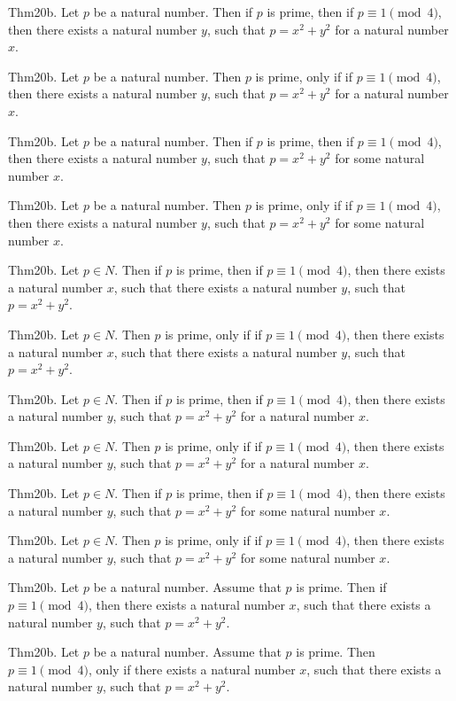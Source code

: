 \documentclass{article}
\begin{document}
Thm20b. Let $p$ be a natural number. Then if $p$ is prime, then if $p \equiv 1 \pmod{ 4}$, then there exists a natural number $y$, such that $p = x ^{ 2}+ y ^{ 2}$ for a natural number $x$.

Thm20b. Let $p$ be a natural number. Then $p$ is prime, only if if $p \equiv 1 \pmod{ 4}$, then there exists a natural number $y$, such that $p = x ^{ 2}+ y ^{ 2}$ for a natural number $x$.

Thm20b. Let $p$ be a natural number. Then if $p$ is prime, then if $p \equiv 1 \pmod{ 4}$, then there exists a natural number $y$, such that $p = x ^{ 2}+ y ^{ 2}$ for some natural number $x$.

Thm20b. Let $p$ be a natural number. Then $p$ is prime, only if if $p \equiv 1 \pmod{ 4}$, then there exists a natural number $y$, such that $p = x ^{ 2}+ y ^{ 2}$ for some natural number $x$.

Thm20b. Let $p \in N$. Then if $p$ is prime, then if $p \equiv 1 \pmod{ 4}$, then there exists a natural number $x$, such that there exists a natural number $y$, such that $p = x ^{ 2}+ y ^{ 2}$.

Thm20b. Let $p \in N$. Then $p$ is prime, only if if $p \equiv 1 \pmod{ 4}$, then there exists a natural number $x$, such that there exists a natural number $y$, such that $p = x ^{ 2}+ y ^{ 2}$.

Thm20b. Let $p \in N$. Then if $p$ is prime, then if $p \equiv 1 \pmod{ 4}$, then there exists a natural number $y$, such that $p = x ^{ 2}+ y ^{ 2}$ for a natural number $x$.

Thm20b. Let $p \in N$. Then $p$ is prime, only if if $p \equiv 1 \pmod{ 4}$, then there exists a natural number $y$, such that $p = x ^{ 2}+ y ^{ 2}$ for a natural number $x$.

Thm20b. Let $p \in N$. Then if $p$ is prime, then if $p \equiv 1 \pmod{ 4}$, then there exists a natural number $y$, such that $p = x ^{ 2}+ y ^{ 2}$ for some natural number $x$.

Thm20b. Let $p \in N$. Then $p$ is prime, only if if $p \equiv 1 \pmod{ 4}$, then there exists a natural number $y$, such that $p = x ^{ 2}+ y ^{ 2}$ for some natural number $x$.

Thm20b. Let $p$ be a natural number. Assume that $p$ is prime. Then if $p \equiv 1 \pmod{ 4}$, then there exists a natural number $x$, such that there exists a natural number $y$, such that $p = x ^{ 2}+ y ^{ 2}$.

Thm20b. Let $p$ be a natural number. Assume that $p$ is prime. Then $p \equiv 1 \pmod{ 4}$, only if there exists a natural number $x$, such that there exists a natural number $y$, such that $p = x ^{ 2}+ y ^{ 2}$.
\end{document}
